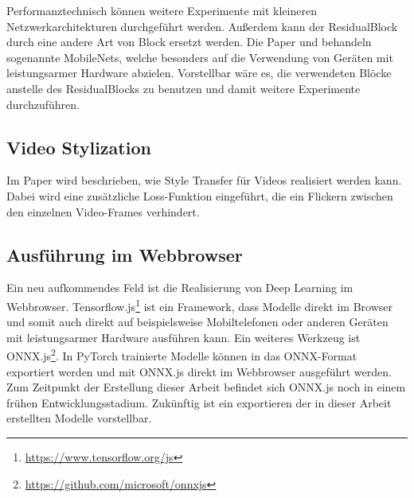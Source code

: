 Performanztechnisch können weitere Experimente mit kleineren Netzwerkarchitekturen durchgeführt werden. Außerdem kann der ResidualBlock durch eine andere Art von Block ersetzt werden. Die Paper \cite{DBLP:journals/corr/HowardZCKWWAA17} und \cite{DBLP:journals/corr/abs-1801-04381} behandeln sogenannte MobileNets, welche besonders auf die Verwendung von Geräten mit leistungsarmer Hardware abzielen. Vorstellbar wäre es, die verwendeten Blöcke anstelle des ResidualBlocks zu benutzen und damit weitere Experimente durchzuführen.

\subsection{Video Stylization}
\label{sec:video_stylization}

Im Paper \cite{DBLP:journals/corr/abs-1807-01197} wird beschrieben, wie Style Transfer für Videos realisiert werden kann. Dabei wird eine zusätzliche Loss-Funktion eingeführt, die ein Flickern zwischen den einzelnen Video-Frames verhindert.

\subsection{Ausführung im Webbrowser}
\label{sec:inference_in_browser}

Ein neu aufkommendes Feld ist die Realisierung von Deep Learning im Webbrowser. Tensorflow.js\footnote{\url{https://www.tensorflow.org/js}} ist ein Framework, dass Modelle direkt im Browser und somit auch direkt auf beispielsweise Mobiltelefonen oder anderen Geräten mit leistungsarmer Hardware ausführen kann. Ein weiteres Werkzeug ist ONNX.js\footnote{\url{https://github.com/microsoft/onnxjs}}. In PyTorch trainierte Modelle können in das ONNX-Format exportiert werden und mit ONNX.js direkt im Webbrowser ausgeführt werden. Zum Zeitpunkt der Erstellung dieser Arbeit befindet sich ONNX.js noch in einem frühen Entwicklungsstadium. Zukünftig ist ein exportieren der in dieser Arbeit erstellten Modelle vorstellbar.